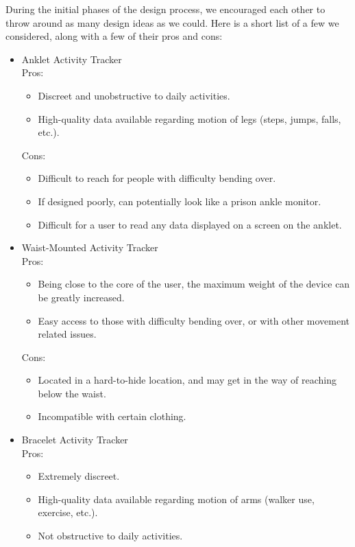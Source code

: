 \documentclass[12pt, titlepage]{article}
\begin{document}
\begin{enumerate}
During the initial phases of the design process, we encouraged each other to throw around as many design ideas as we could. Here is a short list of a few we considered, along with a few of their pros and cons:\\
\begin{itemize}
\item Anklet Activity Tracker\\
	Pros:
	\begin{itemize}
		\item Discreet and unobstructive to daily activities.
		\item High-quality data available regarding motion of legs (steps, jumps, falls, etc.).
	\end{itemize}
	Cons:
	\begin{itemize}
		\item Difficult to reach for people with difficulty bending over.
		\item If designed poorly, can potentially look like a prison ankle monitor.
		\item Difficult for a user to read any data displayed on a screen on the anklet.
	\end{itemize}
\item Waist-Mounted Activity Tracker\\
	Pros:
	\begin{itemize}
		\item Being close to the core of the user, the maximum weight of the device can be greatly increased.
		\item Easy access to those with difficulty bending over, or with other movement related issues.
	\end{itemize}
	Cons:
	\begin{itemize}
		\item Located in a hard-to-hide location, and may get in the way of reaching below the waist.
		\item Incompatible with certain clothing.
	\end{itemize}
\item Bracelet Activity Tracker\\
	Pros:
	\begin{itemize}
		\item Extremely discreet.
		\item High-quality data available regarding motion of arms (walker use, exercise, etc.).
		\item Not obstructive to daily activities.
	\end{itemize}

\end{itemize}
\end{enumerate}
\end{document}
